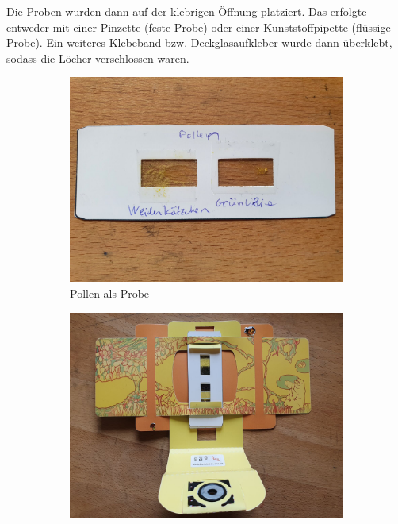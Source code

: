 		Die Proben wurden dann auf der klebrigen Öffnung platziert. Das erfolgte entweder mit einer Pinzette (feste Probe) oder einer Kunststoffpipette (flüssige Probe). Ein weiteres Klebeband bzw. Deckglasaufkleber wurde dann überklebt, sodass die Löcher verschlossen waren. 
		\begin{figure}[H]
			\centering
			\begin{subfigure}[b]{0.3\textwidth}
				\includegraphics[width=\textwidth]{images/tv2/build-01.jpg}
				\caption{Pollen als Probe}
			\end{subfigure}
			\hspace{5pt}
			\begin{subfigure}[b]{0.3\textwidth}
				\includegraphics[width=\textwidth]{images/tv2/build-02.jpg}

\end{subfigure}
\end{figure}
